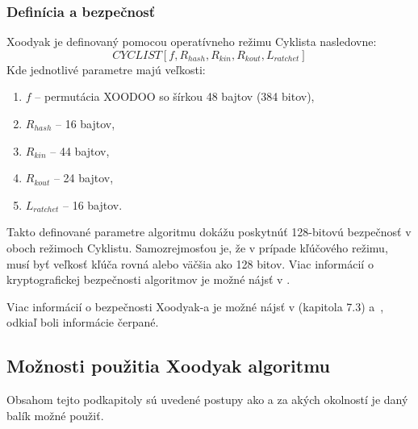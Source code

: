 \subsubsection{Definícia a bezpečnosť}
Xoodyak je definovaný pomocou operatívneho režimu Cyklista nasledovne:
\begin{equation}
	CYCLIST[f,R_{hash},R_{kin},R_{kout},L_{ratchet}]
\end{equation} 
Kde jednotlivé parametre majú veľkosti:
\begin{enumerate}
	\item $f$ -- permutácia XOODOO so šírkou 48 bajtov (384 bitov),
	\item $R_{hash}$ -- 16 bajtov,
	\item $R_{kin}$ -- 44 bajtov,
	\item $R_{kout}$ -- 24 bajtov,
	\item $L_{ratchet}$ -- 16 bajtov.  
\end{enumerate}
Takto definované parametre algoritmu dokážu poskytnúť 128-bitovú bezpečnosť v oboch režimoch Cyklistu. Samozrejmosťou je, že v prípade kľúčového režimu, musí byť veľkosť kľúča rovná alebo väčšia ako 128 bitov. Viac informácií o kryptografickej bezpečnosti algoritmov je možné nájsť v \cite{sec}.

Viac informácií o bezpečnosti Xoodyak-a je možné nájsť v \cite{xcb} (kapitola 7.3) a~\cite{xdr2}, odkiaľ boli informácie čerpané.

\subsection{Možnosti použitia Xoodyak algoritmu}
Obsahom tejto podkapitoly sú uvedené postupy ako a za akých okolností je daný balík možné použiť. 
